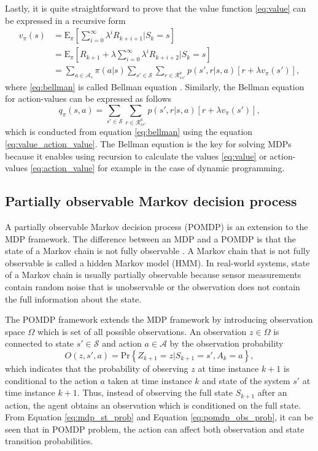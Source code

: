\documentclass[english, 12pt, a4paper, elec, utf8, a-1b, online]{aaltothesis}
\newcommand{\Epolicy}[1]{\mathrm{E}_\pi \left[ #1 \right]}
\newcommand{\Ss}{\mathcal{S}}
\newcommand{\As}{\mathcal{A}}
\newcommand{\Rs}{\mathcal{R}}
\newcommand{\Os}{\Omega}
\newcommand{\Op}{O}
\renewcommand{\Pr}[1]{\text{Pr}\left\{ #1 \right\}}
\begin{document}
Lastly, it is quite straightforward to prove that the value function \eqref{eq:value} can be expressed in a recursive form 
\begin{align}
    v_\pi(s) 
    &= \Epolicy{ \sum_{i=0}^{\infty} \lambda^i R_{k + i + 1} | S_k=s} \\
    &= \Epolicy{R_{k + 1} + \lambda \sum_{i=0}^{\infty} \lambda^i R_{k + i + 2} | S_k=s} \\
    &= \sum_{a \in \As_s} \pi(a | s) \sum_{s' \in \Ss} \sum_{r \in \Rs_{ss'}^a} p(s', r | s, a) \left[ r + \lambda v_\pi(s') \right]\label{eq:bellman},
\end{align}
where \eqref{eq:bellman} is called Bellman equation \cite{Sutton2018}.
Similarly, the Bellman equation for action-values can be expressed as follows
\begin{equation}\label{eq:bellman_action}
     q_\pi(s, a) = \sum_{s' \in \Ss} \sum_{r \in \Rs_{ss'}^a} p(s', r | s, a) \left[ r + \lambda v_\pi(s') \right],
\end{equation}
which is conducted from equation \eqref{eq:bellman} using the equation \eqref{eq:value_action_value}.
The Bellman equation is the key for solving MDPs because it enables using recursion to calculate the values \eqref{eq:value} or action-values \eqref{eq:action_value} for example in the case of dynamic programming.


\subsection{Partially observable Markov decision process} \label{sec:POMDP}


A partially observable Markov decision process (POMDP) is an extension to the MDP framework. 
The difference between an MDP and a POMDP is that the state of a Markov chain is not fully observable \cite{Krishnamurthy2016}.
A Markov chain that is not fully observable is called a hidden Markov model (HMM).
In real-world systems, state of a Markov chain is usually partially observable because sensor measurements contain random noise that is unobservable or the observation does not contain the full information about the state.

The POMDP framework extends the MDP framework by introducing observation space $\Os$ which is set of all possible observations.
An observation $z \in \Os$ is connected to state $s' \in \Ss$ and action $a \in \As$ by the observation probability
\begin{equation}\label{eq:pomdp_obs_prob}
    \Op(z , s', a) = \Pr{Z_{k+1}=z | S_{k+1}=s', A_k=a},
\end{equation}
which indicates that the probability of observing $z$ at time instance $k+1$ is conditional to the action $a$ taken at time instance $k$ and state of the system $s'$ at time instance $k+1$.
Thus, instead of observing the full state $S_{k+1}$ after an action, the agent obtains an observation which is conditioned on the full state.
From Equation \eqref{eq:mdp_st_prob} and Equation \eqref{eq:pomdp_obs_prob}, it can be seen that in POMDP problem, the action can affect both observation and state transition probabilities.
\end{document}
